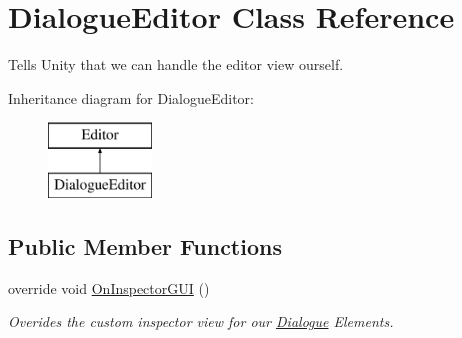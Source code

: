 \hypertarget{class_dialogue_editor}{}\section{Dialogue\+Editor Class Reference}
\label{class_dialogue_editor}


Tells Unity that we can handle the editor view ourself.  


Inheritance diagram for Dialogue\+Editor\+:\begin{figure}[H]
\begin{center}
\leavevmode
\includegraphics[height=2.000000cm]{class_dialogue_editor}
\end{center}
\end{figure}
\subsection*{Public Member Functions}
\begin{DoxyCompactItemize}
\item 
override void \mbox{\hyperlink{class_dialogue_editor_ad36b3f14a8f1f1a9d71c716751e9e889}{On\+Inspector\+G\+UI}} ()
\begin{DoxyCompactList}\small\item\em Overides the custom inspector view for our \mbox{\hyperlink{class_dialogue}{Dialogue}} Elements. \end{DoxyCompactList}\end{DoxyCompactItemize}
